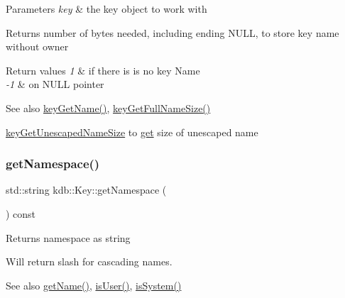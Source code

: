 \begin{DoxyParams}{Parameters}
{\em key} & the key object to work with \\
\hline
\end{DoxyParams}
\begin{DoxyReturn}{Returns}
number of bytes needed, including ending N\+U\+LL, to store key name without owner 
\end{DoxyReturn}

\begin{DoxyRetVals}{Return values}
{\em 1} & if there is is no key Name \\
\hline
{\em -\/1} & on N\+U\+LL pointer \\
\hline
\end{DoxyRetVals}
\begin{DoxySeeAlso}{See also}
\mbox{\hyperlink{group__keyname_gab29a850168d9b31c9529e90cf9ab68be}{key\+Get\+Name()}}, \mbox{\hyperlink{group__keyname_gab65dc9d43d3ee08d5e936a20ebbddd23}{key\+Get\+Full\+Name\+Size()}} 

\mbox{\hyperlink{group__keyname_ga5e7eff0c77678420199d0d2e8729152b}{key\+Get\+Unescaped\+Name\+Size}} to \mbox{\hyperlink{classkdb_1_1Key_ac558a1f1b2cb50d77fbabcbb24950c05}{get}} size of unescaped name 
\end{DoxySeeAlso}
\mbox{\label{classkdb_1_1Key_a71b191c56eacb692c2f92ed440b32b46}} 
\subsubsection{\texorpdfstring{getNamespace()}{getNamespace()}}
{\footnotesize\ttfamily std\+::string kdb\+::\+Key\+::get\+Namespace (\begin{DoxyParamCaption}{ }\end{DoxyParamCaption}) const\hspace{0.3cm}{\ttfamily [inline]}}

\begin{DoxyReturn}{Returns}
namespace as string
\end{DoxyReturn}
Will return slash for cascading names.

\begin{DoxySeeAlso}{See also}
\mbox{\hyperlink{classkdb_1_1Key_a6c1812730e9cb714893c9f9b1e503303}{get\+Name()}}, \mbox{\hyperlink{classkdb_1_1Key_a3b3d0d74246b259b10caed425216d91c}{is\+User()}}, \mbox{\hyperlink{classkdb_1_1Key_a44833fb97b02ca58205c48d740c4cada}{is\+System()}} 
\end{DoxySeeAlso}
\mbox{\label{classkdb_1_1Key_ae050f835e06aa0ecb828315e1fdb63ea}} 
